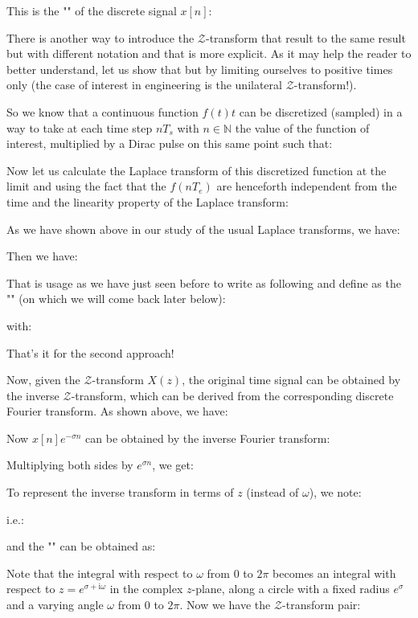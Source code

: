 	This is the "" of the discrete signal $x[n]$:
	
	
	There is another way to introduce the $\mathcal{Z}$-transform that result to the same result but with different notation and that is more explicit. As it may help the reader to better understand, let us show that but by limiting ourselves to positive times only (the case of interest in engineering is the unilateral $\mathcal{Z}$-transform!).

So we know that a continuous function $f(t)t$ can be discretized (sampled) in a way to take at each time step $nT_s$ with $n\in \mathbb{N}$ the value of the function of interest, multiplied by a Dirac pulse on this same point such that:
	
	Now let us calculate the Laplace transform of this discretized function at the limit and using the fact that the $f(nT_e)$ are henceforth independent from the time and the linearity property of the Laplace transform:
	
	As we have shown above in our study of the usual Laplace transforms, we have:
	
	Then we have:
	
	That is usage as we have just seen before to write as following and define as the "" (on which we will come back later below):
	
	with:
	
	That's it for the second approach!
	
	Now, given the $\mathcal{Z}$-transform $X(z)$, the original time signal can be obtained by the inverse $\mathcal{Z}$-transform, which can be derived from the corresponding discrete Fourier transform. As shown above, we have:
	
	Now $x[n]e^{-\sigma n}$ can be obtained by the inverse Fourier transform:
	
	Multiplying both sides by $e^{\sigma n}$, we get:
	
	To represent the inverse transform in terms of $z$ (instead of $\omega$), we note:
	
	i.e.:
	
	and the "" can be obtained as:
	
	Note that the integral with respect to $\omega$ from $0$ to $2\pi$ becomes an integral with respect to $z=e^{\sigma+\mathrm{i}\omega}$ in the complex $z$-plane, along a circle with a fixed radius $e^\sigma$ and a varying angle $\omega$ from $0$ to $2\pi$. Now we have the $\mathcal{Z}$-transform pair:
	
